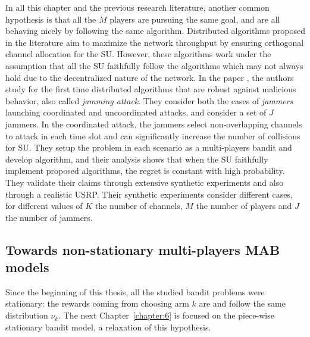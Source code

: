 In all this chapter and the previous research literature, another common hypothesis is that all the $M$ players are pursuing the same goal, and are all behaving nicely by following the same algorithm.
Distributed algorithms proposed in the literature aim to maximize the network throughput by ensuring orthogonal channel allocation for the SU.
However, these algorithms work under the assumption that all the SU faithfully follow the algorithms which may not always hold due to the decentralized nature of the network.
In the paper \cite{SawantKumar2018}, the authors study for the first time distributed algorithms that are robust against malicious behavior, also called \emph{jamming attack}.
They consider both the cases of \emph{jammers} launching coordinated and uncoordinated attacks, and consider a set of $J$ jammers.
In the coordinated attack, the jammers select non-overlapping channels to attack in each time slot and can significantly increase the number of collisions for SU.
They setup the problem in each scenario as a multi-players bandit and develop algorithm,
and their analysis shows that when the SU faithfully implement proposed algorithms, the regret is constant with high probability.
They validate their claims through extensive synthetic experiments and also through a realistic USRP.
Their synthetic experiments consider different cases, for different values of $K$ the number of channels, $M$ the number of players and $J$ the number of jammers.



\subsection{Towards non-stationary multi-players MAB models}
\label{sub:5:towardsNonStationaryModels}

Since the beginning of this thesis, all the studied bandit problems were stationary: the rewards coming from choosing arm $k$ are \iid{} and follow the same distribution $\nu_k$.
The next Chapter~\ref{chapter:6} is focused on the piece-wise stationary bandit model, a relaxation of this hypothesis.

